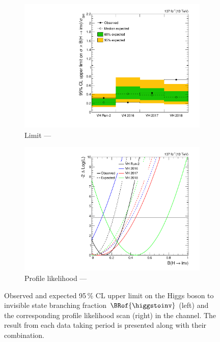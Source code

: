 \begin{figure}[htbp]
    \centering
    \begin{subfigure}[t]{0.48\textwidth}
        \includegraphics[width=\textwidth]{figures/limits/VH/limit_Run2_VH.pdf}
        \caption{Limit --- \VH}
    \end{subfigure}
    \hfill
    \begin{subfigure}[t]{0.48\textwidth}
        \includegraphics[width=\textwidth]{figures/likelihood_scan/profile_likelihood_scan_Run2_VH.pdf}
        \caption{Profile likelihood --- \VH}
    \end{subfigure}
    \caption[Observed and expected 95\,\% CL upper limit on the Higgs boson to invisible state branching fraction $\BRof{\higgstoinv}$ (left) and the corresponding profile likelihood scan (right) in the \VH channel]{Observed and expected 95\,\% CL upper limit on the Higgs boson to invisible state branching fraction $\BRof{\higgstoinv}$ (left) and the corresponding profile likelihood scan (right) in the \VH channel. The result from each data taking period is presented along with their combination.}
    \label{fig:htoinv_limit_VH}
\end{figure}

